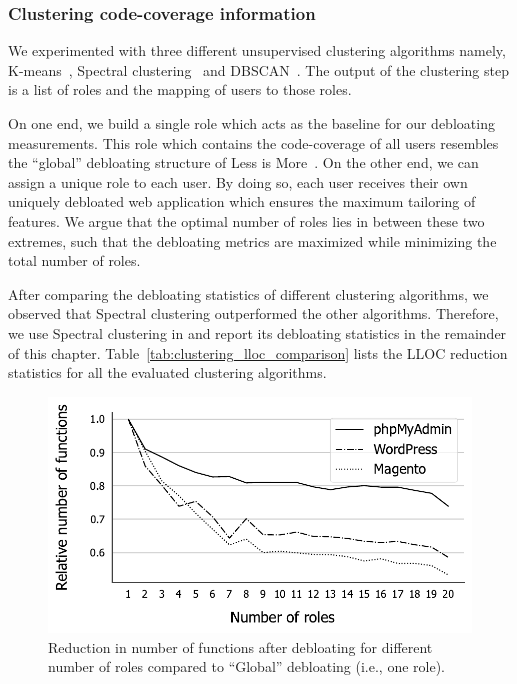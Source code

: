 \subsubsection{Clustering code-coverage information} We experimented with three different unsupervised clustering algorithms namely, K-means~\cite{Jin2010}, Spectral clustering~\cite{spectralclustering} and DBSCAN~\cite{dbscan}.
The output of the clustering step is a list of roles and the mapping of users to those roles.  

On one end, we build a single role which acts as the baseline for our debloating measurements. 
This role which contains the code-coverage of all users resembles the ``global'' debloating structure of Less is More~\cite{lessismore}. 
On the other end, we can assign a unique role to each user. 
By doing so, each user receives their own uniquely debloated web application which ensures the maximum tailoring of features. 
We argue that the optimal number of roles lies in between these two extremes, such that the debloating metrics are maximized while minimizing the total number of roles. 


After comparing the debloating statistics of different clustering algorithms, we observed that Spectral clustering outperformed the other algorithms. Therefore, we use Spectral clustering in \dbltr{} and report its debloating statistics in the remainder of this chapter. 
Table~\ref{tab:clustering_lloc_comparison} lists the LLOC reduction statistics for all the evaluated clustering algorithms.

\begin{figure}[]
    \centering
    \includegraphics[width=0.8\linewidth]{figures/dbltr/optimalroles_bw.pdf}
    \caption{Reduction in number of functions after debloating for different number of roles compared to ``Global'' debloating (i.e., one role).}
    \label{fig:optimalroles}
\end{figure}

